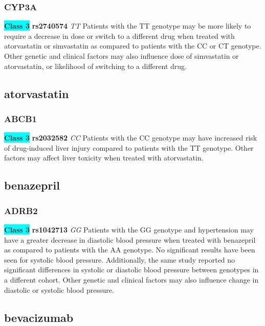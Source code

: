 \documentclass{book}
\begin{document}
\subsubsection{ CYP3A }

\begin{center}
\textbf{\colorbox{cyan} {Class 3}} \textbf{ rs2740574 } \textit{ TT }
Patients with the TT genotype may be more likely to require a decrease in dose or switch to a different drug when treated with atorvastatin or simvastatin as compared to patients with the CC or CT genotype. Other genetic and clinical factors may also influence dose of simvastatin or atorvastatin, or likelihood of switching to a different drug.


\end{center}\subsection{ atorvastatin }


\subsubsection{ ABCB1 }

\begin{center}
\textbf{\colorbox{cyan} {Class 3}} \textbf{ rs2032582 } \textit{ CC }
Patients with the CC genotype may have increased risk of drug-induced liver injury compared to patients with the TT genotype. Other factors may affect liver toxicity when treated with atorvastatin.


\end{center}\subsection{ benazepril }


\subsubsection{ ADRB2 }

\begin{center}
\textbf{\colorbox{cyan} {Class 3}} \textbf{ rs1042713 } \textit{ GG }
Patients with the GG genotype and hypertension may have a greater decrease in diastolic blood pressure when treated with benazepril as compared to patients with the AA genotype. No significant results have been seen for systolic blood pressure. Additionally, the same study reported no significant differences in systolic or diastolic blood pressure between genotypes in a different cohort. Other genetic and clinical factors may also influence change in diastolic or systolic blood pressure.


\end{center}\subsection{ bevacizumab }
\end{document}
